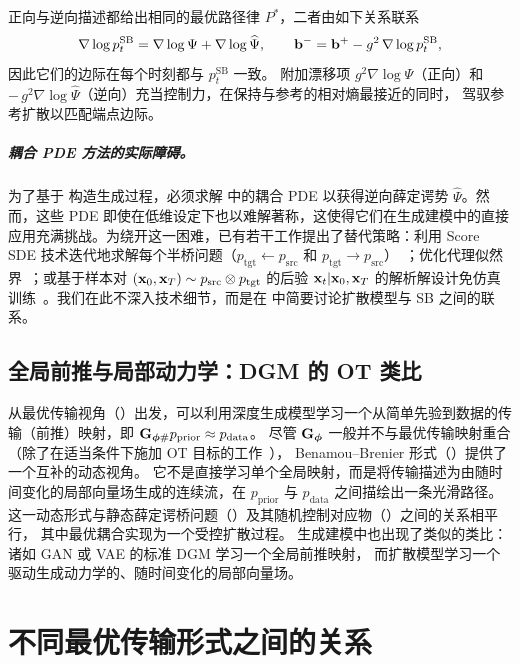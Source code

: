 正向与逆向描述都给出相同的最优路径律 $P^*$，二者由如下关系联系
\[
\nabla\log p_t^{\mathrm{SB}}=\nabla\log\Psi+\nabla\log\widehat\Psi,
\qquad
{\mathbf{b}}^{-}={\mathbf{b}}^{+}-g^2\,\nabla\log p_t^{\mathrm{SB}},
\]
因此它们的边际在每个时刻都与 $p_t^{\mathrm{SB}}$ 一致。  附加漂移项 $g^2\nabla\log\Psi$（正向）和
$-\,g^2\nabla\log\widehat{\Psi}$（逆向）充当控制力，在保持与参考的相对熵最接近的同时，
驾驭参考扩散以匹配端点边际。




\subparagraph{耦合 PDE 方法的实际障碍。}
为了基于  构造生成过程，必须求解  中的耦合 PDE 以获得逆向薛定谔势 $\widehat{\Psi}$。然而，这些 PDE 即使在低维设定下也以难解著称，这使得它们在生成建模中的直接应用充满挑战。为绕开这一困难，已有若干工作提出了替代策略：利用 Score SDE 技术迭代地求解每个半桥问题（$p_{\mathrm{tgt}} \leftarrow p_{\mathrm{src}}$ 和 $p_{\mathrm{tgt}} \rightarrow p_{\mathrm{src}}$）~\citep{de2021diffusion}；优化代理似然界~\citep{chenlikelihood, liu20232}；或基于样本对 $({\mathbf{x}}_0, {\mathbf{x}}_T) \sim p_{\mathrm{src}} \otimes p_{\mathrm{tgt}}$ 的后验 ${\mathbf{x}}_t \vert {\mathbf{x}}_0, {\mathbf{x}}_T$ 的解析解设计免仿真训练~\citep{liu20232}。我们在此不深入技术细节，而是在  中简要讨论扩散模型与 SB 之间的联系。

\subsection{全局前推与局部动力学：DGM 的 OT 类比}
从最优传输视角（）出发，可以利用深度生成模型学习一个从简单先验到数据的传输（前推）映射，即 
${\mathbf{G}}_{\bm{\phi}\#}p_{\mathrm{prior}} \approx p_{\mathrm{data}}$。 
尽管 ${\mathbf{G}}_{\bm{\phi}}$ 一般并不与最优传输映射重合
（除了在适当条件下施加 OT 目标的工作~\citep{genevay2018learning,onken2021ot}），
Benamou--Brenier 形式（）提供了一个互补的动态视角。
它不是直接学习单个全局映射，而是将传输描述为由随时间变化的局部向量场生成的连续流，在 $p_{\mathrm{prior}}$ 与 $p_{\mathrm{data}}$ 之间描绘出一条光滑路径。
这一动态形式与静态薛定谔桥问题（）及其随机控制对应物（）之间的关系相平行，
其中最优耦合实现为一个受控扩散过程。
生成建模中也出现了类似的类比：
诸如 GAN 或 VAE 的标准 DGM 学习一个全局前推映射，
而扩散模型学习一个驱动生成动力学的、随时间变化的局部向量场。




\newpage
\section{不同最优传输形式之间的关系}\label{sec:relation-ot}

